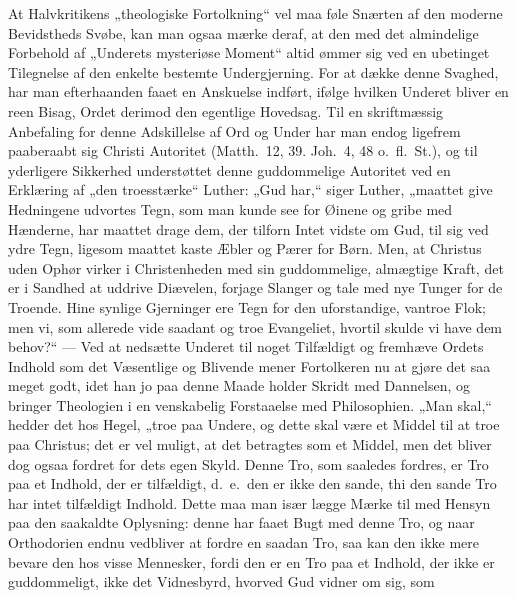 \documentclass[12pt,a4paper]{book}
\begin{document}
At Halvkritikens „theologiske Fortolkning“ vel maa føle Snærten af den moderne Bevidstheds
Svøbe, kan man ogsaa mærke deraf, at den med det almindelige Forbehold af „Underets
mysteriøse Moment“ altid ømmer sig ved en ubetinget Tilegnelse af den enkelte bestemte
Undergjerning. For at dække denne Svaghed, har man efterhaanden faaet en Anskuelse indført,
ifølge hvilken Underet bliver en reen Bisag, Ordet derimod den egentlige Hovedsag. Til en
skriftmæssig Anbefaling for denne Adskillelse af Ord og Under har man endog ligefrem
paaberaabt sig Christi Autoritet (Matth.\ 12, 39. Joh.\ 4, 48 o.\ fl.\ St.), og til
yderligere Sikkerhed understøttet denne guddommelige Autoritet ved en Erklæring af „den
troesstærke“ Luther: „Gud har,“ siger Luther, „maattet give Hedningene udvortes Tegn, som man
kunde see for Øinene og gribe med Hænderne, har maattet drage dem, der tilforn Intet vidste
om Gud, til sig ved ydre Tegn, ligesom maattet kaste Æbler og Pærer for Børn. Men, at
Christus uden Ophør virker i Christenheden med sin guddommelige, almægtige Kraft, det er i
Sandhed at uddrive Diævelen, forjage Slanger og tale med nye Tunger for de Troende. Hine
synlige Gjerninger ere Tegn for den uforstandige, vantroe Flok; men vi, som allerede vide
saadant og troe Evangeliet, hvortil skulde vi have dem behov?“ --- Ved at nedsætte Underet
til noget Tilfældigt og fremhæve Ordets Indhold som det Væsentlige og Blivende mener
Fortolkeren nu at gjøre det saa meget godt, idet han jo paa denne Maade holder Skridt med
Dannelsen, og bringer Theologien i en venskabelig Forstaaelse
med Philosophien. „Man skal,“ hedder det hos Hegel, „troe paa Undere, og dette skal være et
Middel til at troe paa Christus; det er vel muligt, at det betragtes som et Middel, men det
bliver dog ogsaa fordret for dets egen Skyld. Denne Tro, som saaledes fordres, er Tro paa et
Indhold, der er tilfældigt, d.\ e.\ den er ikke den sande, thi den sande Tro har intet
tilfældigt Indhold. Dette maa man især lægge Mærke til med Hensyn paa den saakaldte
Oplysning: denne har faaet Bugt med denne Tro, og naar Orthodorien endnu vedbliver at fordre
en saadan Tro, saa kan den ikke mere bevare den hos visse Mennesker, fordi den er en Tro paa
et Indhold, der ikke er guddommeligt, ikke det Vidnesbyrd, hvorved Gud vidner om sig, som
\end{document}
